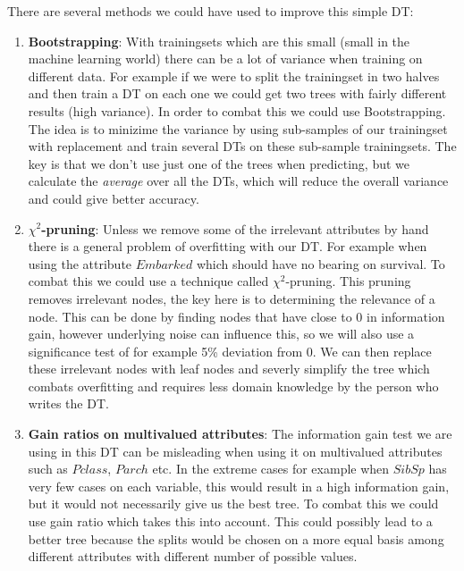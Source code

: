 \documentclass[11pt, english]{../Template/NTNUoving}
\begin{document}
\begin{oppgave}
\begin{punkt}
        There are several methods we could have used to improve this simple DT:
        \begin{enumerate}
            \item \textbf{Bootstrapping}: With trainingsets which are this small (small in the machine learning world) there can be a lot of variance when training on different data.
            For example if we were to split the trainingset in two halves and then train a DT on each one we could get two trees with fairly different results (high variance). In order to
            combat this we could use Bootstrapping\cite{ml}\cite{bootstrapping}. The idea is to minizime the variance by
            using sub-samples of our trainingset with replacement and train several DTs on these sub-sample trainingsets. The key is that we don't use just one of the trees when predicting, but we calculate the
            \textit{average} over all the DTs, which will reduce the overall variance and could give better accuracy.
            \item \textbf{$\chi^2$-pruning}: Unless we remove some of the irrelevant attributes by hand there is a general problem of overfitting with our DT. For example when using the attribute $Embarked$ which should have no bearing
            on survival. To combat this we could use a technique called $\chi^2$-pruning. This pruning removes irrelevant nodes, the key here is to determining the relevance of a node.
            This can be done by finding nodes that have close to 0 in information gain, however underlying noise can influence this, so we will also use a significance test of for example 5\% deviation from 0.
            We can then replace these irrelevant nodes with leaf nodes and severly simplify the tree which combats overfitting and requires less domain knowledge by the person who writes the DT.
            \item \textbf{Gain ratios on multivalued attributes}: The information gain test we are using in this DT can be misleading when using it on multivalued attributes such as $Pclass$, $Parch$ etc.
            In the extreme cases for example when $SibSp$ has very few cases on each variable, this would result in a high information gain, but it would not necessarily give us the best tree. To combat this we could
            use gain ratio \cite{gain} which takes this into account. This could possibly lead to a better tree because the splits would be chosen on a more equal basis among different
            attributes with different number of possible values.
        \end{enumerate}
    \end{punkt}
\end{oppgave}
\end{document}
